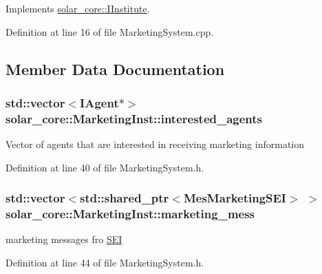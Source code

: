 Implements \hyperlink{classsolar__core_1_1_i_institute_ad27e64b6bdad198bb04d7ddd9c5a3252}{solar\+\_\+core\+::\+I\+Institute}.



Definition at line 16 of file Marketing\+System.\+cpp.



\subsection{Member Data Documentation}
\hypertarget{classsolar__core_1_1_marketing_inst_a5e0f3d40db44d0779a944ecdad24d447}{}
\subsubsection[{interested\+\_\+agents}]{\setlength{\rightskip}{0pt plus 5cm}std\+::vector$<${\bf I\+Agent}$\ast$$>$ solar\+\_\+core\+::\+Marketing\+Inst\+::interested\+\_\+agents\hspace{0.3cm}{\ttfamily [protected]}}\label{classsolar__core_1_1_marketing_inst_a5e0f3d40db44d0779a944ecdad24d447}
Vector of agents that are interested in receiving marketing information 

Definition at line 40 of file Marketing\+System.\+h.

\hypertarget{classsolar__core_1_1_marketing_inst_af386df7399502fc26c6625600a68edb3}{}
\subsubsection[{marketing\+\_\+mess}]{\setlength{\rightskip}{0pt plus 5cm}std\+::vector$<$std\+::shared\+\_\+ptr$<${\bf Mes\+Marketing\+S\+E\+I}$>$ $>$ solar\+\_\+core\+::\+Marketing\+Inst\+::marketing\+\_\+mess\hspace{0.3cm}{\ttfamily [protected]}}\label{classsolar__core_1_1_marketing_inst_af386df7399502fc26c6625600a68edb3}
marketing messages fro \hyperlink{classsolar__core_1_1_s_e_i}{S\+E\+I} 

Definition at line 44 of file Marketing\+System.\+h.

